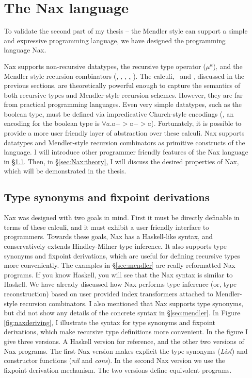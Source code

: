 \section{The Nax language}\label{sec:Nax}

To validate the second part of my thesis -- the Mendler style can support 
a simple and expressive programming language, we have designed the
programming language Nax.

Nax supports non-recursive datatypes, the recursive type operator
($\mu^\kappa$), and the Mendler-style recursion combinators (\MIt, \MPr,
\McvIt, \McvPr, \MsfIt). The calculi, \Fi\ and \Fixi, discussed
in the previous sections, are theoretically powerful enough to capture
the semantics of both recursive types and Mendler-style recursion schemes.
However, they are far from practical programming languages. Even very simple
datatypes, such as the boolean type, must be defined via impredicative 
Church-style encodings (\eg, an encoding for the boolean type is
$\forall a . a -> a -> a$). Fortunately, it is possible to provide
a more user friendly layer of abstraction over these calculi. Nax supports
datatypes and Mendler-style recursion combinators as primitive constructs of
the language. I will introduce other programmer friendly features of
the Nax language in \S\ref{sec:Nax:tysym}. Then, in \S\ref{sec:Nax:theory},
I will discuss the desired properties of Nax, which will be demonstrated
in the thesis.

\subsection{Type synonyms and fixpoint derivations}\label{sec:Nax:tysym}

Nax was designed with two goals in mind. First it must be directly definable
in terms of these calculi, and it must exhibit a user friendly interface to
programmers. Towards these goals, Nax has a Haskell-like syntax, and
conservatively extends Hindley-Milner type inference. It also supports
type synonyms and fixpoint derivations, which are useful for defining
recursive types more conveniently. The examples in \S\ref{sec:mendler} are
really reformatted Nax programs. If you know Haskell, you will see that
the Nax syntax is similar to Haskell. We have already discussed how Nax
performs type inference (or, type reconstruction) based on user provided
index transformers attached to Mendler-style recursion combinators. I also
mentioned that Nax supports type synonyms, but did not show any details of
the concrete syntax in \S\ref{sec:mendler}. In Figure \ref{fig:naxderiving},
I illustrate the syntax for type synonyms and fixpoint derivations, which make
recursive type definitions more convenient. In the figure I give three versions.
A Haskell version for reference, and the other two versions of Nax programs.
The first Nax version makes explicit the type synonyms (\textit{List})
and constructor functions (\textit{nil} and \textit{cons}).
In the second Nax version we use the fixpoint derivation mechanism.
The two versions define equivalent programs.

